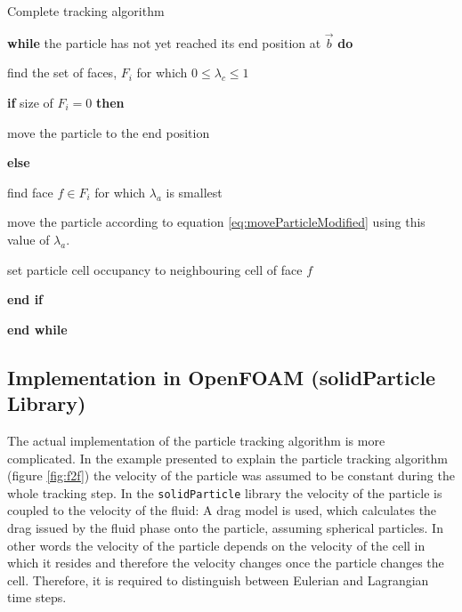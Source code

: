\begin{algo}{Complete tracking algorithm}
\label{alg:ttf}

	\textbf{while} the particle has not yet reached its end position at $\vec{b}$ \textbf{do}
	
	\noindent\hspace*{1cm}find the set of faces, $F_i$ for which $0 \leq \lambda_c \leq 1$
	
	\noindent\hspace*{1cm}\textbf{if} size of $F_i=0$ \textbf{then}
	
	\noindent\hspace*{2cm}move the particle to the end position
	
	\noindent\hspace*{1cm}\textbf{else}
	
	\noindent\hspace*{2cm}find face $f \in F_i$ for which $\lambda_a$ is smallest
	
	\noindent\hspace*{2cm}move the particle according to equation \ref{eq:moveParticleModified} using this value of $\lambda_a$.
	
	\noindent\hspace*{2cm}set particle cell occupancy to neighbouring cell of face $f$
	
	\noindent\hspace*{1cm}\textbf{end if}

\textbf{end while}

\end{algo}

\subsection{Implementation in OpenFOAM (solidParticle Library)}

The actual implementation of the particle tracking algorithm is more complicated. In the example presented to explain the particle tracking algorithm (figure \ref{fig:f2f}) the velocity of the particle was assumed to be constant during the whole tracking step. In the \verb+solidParticle+ library the velocity of the particle is coupled to the velocity of the fluid: A drag model is used, which calculates the drag issued by the fluid phase onto the particle, assuming spherical particles. In other words the velocity of the particle depends on the velocity of the cell in which it resides and therefore the velocity changes once the particle changes the cell. Therefore, it is required to distinguish between Eulerian and Lagrangian time steps.

